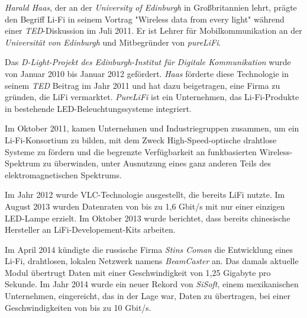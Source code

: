 \begin{multicols}{3}

\textit{Harald Haas}, der an der \textit{University of Edinburgh} in Großbritannien lehrt, prägte den Begriff Li-Fi in seinem Vortrag "Wireless data from every light" während einer \textit{TED}-Diskussion im Juli 2011. Er ist Lehrer für Mobilkommunikation an der \textit{Universität von Edinburgh} und Mitbegründer von \textit{pureLiFi}.

Das \textit{D-Light-Projekt des Edinburgh-Institut für Digitale Kommunikation} wurde von Januar 2010 bis Januar 2012 gefördert. \textit{Haas} förderte diese Technologie in seinem \textit{TED} Beitrag im Jahr 2011 und hat dazu beigetragen, eine Firma zu gründen, die LiFi vermarktet. \textit{PureLiFi} ist ein Unternehmen, das Li-Fi-Produkte in bestehende LED-Beleuchtungssysteme integriert.

Im Oktober 2011, kamen Unternehmen und Industriegruppen zusammen, um ein Li-Fi-Konsortium zu bilden, mit dem Zweck High-Speed-optische drahtlose Systeme zu fördern und die begrenzte Verfügbarkeit an funkbasierten Wireless-Spektrum zu überwinden, unter Ausnutzung eines ganz anderen Teils des elektromagnetischen Spektrums.

Im Jahr 2012 wurde VLC-Technologie ausgestellt, die bereits LiFi nutzte. Im August 2013 wurden Datenraten von bis zu 1,6 Gbit/s mit nur einer einzigen LED-Lampe erzielt. Im Oktober 2013 wurde berichtet, dass bereits chinesische Hersteller an LiFi-Developement-Kits arbeiten.

Im April 2014 kündigte die russische Firma \textit{Stins Coman} die Entwicklung eines Li-Fi, drahtlosen, lokalen Netzwerk namens \textit{BeamCaster} an. Das damals aktuelle Modul übertrugt Daten mit einer Geschwindigkeit von 1,25 Gigabyte pro Sekunde. Im Jahr 2014 wurde ein neuer Rekord von \textit{SiSoft}, einem mexikanischen Unternehmen, eingereicht, das in der Lage war, Daten zu übertragen, bei einer Geschwindigkeiten von bis zu 10 Gbit/s.


\end{multicols}

